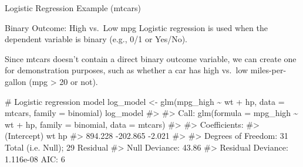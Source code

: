\documentclass[
  18 pt,
  ignorenonframetext,
  aspectratio=1610,
]{beamer}
\newenvironment{Shaded}{\begin{snugshade}}{\end{snugshade}}
\newcommand{\AttributeTok}[1]{\textcolor[rgb]{0.40,0.45,0.13}{#1}}
\newcommand{\CommentTok}[1]{\textcolor[rgb]{0.37,0.37,0.37}{#1}}
\newcommand{\DecValTok}[1]{\textcolor[rgb]{0.68,0.00,0.00}{#1}}
\newcommand{\FunctionTok}[1]{\textcolor[rgb]{0.28,0.35,0.67}{#1}}
\newcommand{\NormalTok}[1]{\textcolor[rgb]{0.00,0.23,0.31}{#1}}
\newcommand{\OtherTok}[1]{\textcolor[rgb]{0.00,0.23,0.31}{#1}}
\newcommand{\SpecialCharTok}[1]{\textcolor[rgb]{0.37,0.37,0.37}{#1}}
\begin{document}
\begin{frame}[fragile]{Logistic Regression Example (mtcars)}
\protect\hypertarget{logistic-regression-example-mtcars}{}
\begin{block}{Binary Outcome: High vs.~Low mpg}
\protect\hypertarget{binary-outcome-high-vs.-low-mpg}{}
Logistic regression is used when the dependent variable is binary (e.g.,
0/1 or Yes/No).

Since mtcars doesn't contain a direct binary outcome variable, we can
create one for demonstration purposes, such as whether a car has high
vs.~low miles-per-gallon (mpg \textgreater{} 20 or not). \tiny

\begin{Shaded}
\end{Shaded}

\begin{Shaded}
\begin{Highlighting}[]
\CommentTok{\# Logistic regression model}
\NormalTok{log\_model }\OtherTok{\textless{}{-}} \FunctionTok{glm}\NormalTok{(mpg\_high }\SpecialCharTok{\textasciitilde{}}\NormalTok{ wt }\SpecialCharTok{+}\NormalTok{ hp, }\AttributeTok{data =}\NormalTok{ mtcars, }\AttributeTok{family =}\NormalTok{ binomial)}
\NormalTok{log\_model}
\CommentTok{\#\textgreater{} }
\CommentTok{\#\textgreater{} Call:  glm(formula = mpg\_high \textasciitilde{} wt + hp, family = binomial, data = mtcars)}
\CommentTok{\#\textgreater{} }
\CommentTok{\#\textgreater{} Coefficients:}
\CommentTok{\#\textgreater{} (Intercept)           wt           hp  }
\CommentTok{\#\textgreater{}     894.228     {-}202.865       {-}2.021  }
\CommentTok{\#\textgreater{} }
\CommentTok{\#\textgreater{} Degrees of Freedom: 31 Total (i.e. Null);  29 Residual}
\CommentTok{\#\textgreater{} Null Deviance:       43.86 }
\CommentTok{\#\textgreater{} Residual Deviance: 1.116e{-}08     AIC: 6}
\end{Highlighting}
\end{Shaded}
\end{block}
\end{frame}
\end{document}
